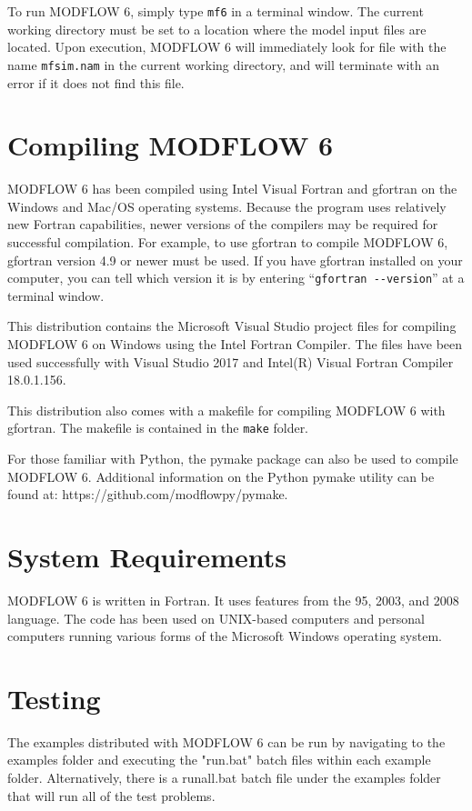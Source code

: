 \documentclass[11pt,twoside,twocolumn]{usgsreport}
\begin{document}
To run MODFLOW 6, simply type \texttt{mf6} in a terminal window.  The current working directory must be set to a location where the model input files are located.  Upon execution, MODFLOW 6 will immediately look for file with the name \texttt{mfsim.nam} in the current working directory, and will terminate with an error if it does not find this file.

\section{Compiling MODFLOW 6}
MODFLOW 6 has been compiled using Intel Visual Fortran and gfortran on the Windows and Mac/OS operating systems.  Because the program uses relatively new Fortran capabilities, newer versions of the compilers may be required for successful compilation.  For example, to use gfortran to compile MODFLOW 6, gfortran version 4.9 or newer must be used.  If you have gfortran installed on your computer, you can tell which version it is by entering ``\verb|gfortran --version|'' at a terminal window.

This distribution contains the Microsoft Visual Studio project files for compiling MODFLOW 6 on Windows using the Intel Fortran Compiler.  The files have been used successfully with Visual Studio 2017 and Intel(R) Visual Fortran Compiler 18.0.1.156.

This distribution also comes with a makefile for compiling MODFLOW 6 with gfortran.  The makefile is contained in the \texttt{make} folder.

For those familiar with Python, the pymake package can also be used to compile MODFLOW 6.  Additional information on the Python pymake utility can be found at: https://github.com/modflowpy/pymake.  

\section{System Requirements}
MODFLOW 6 is written in Fortran.  It uses features from the 95, 2003, and 2008 language.  The code has been used on UNIX-based computers and personal computers running various forms of the Microsoft Windows operating system.

\section{Testing}
The examples distributed with MODFLOW 6 can be run by navigating to the examples folder and executing the "run.bat" batch files within each example folder.  Alternatively, there is a runall.bat batch file under the examples folder that will run all of the test problems.
\end{document}

